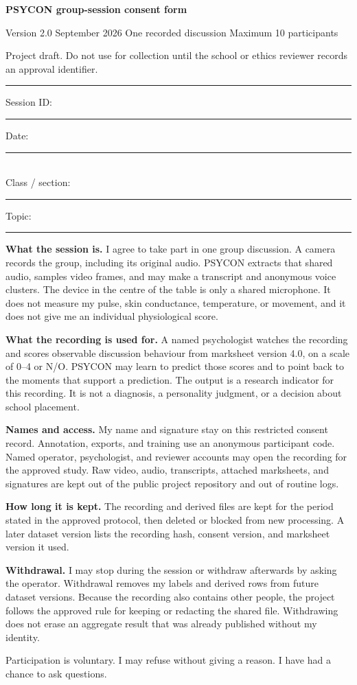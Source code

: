 \documentclass[10pt,a4paper]{article}
\begin{document}
{\LARGE\bfseries PSYCON group-session consent form}\par
{\small Version 2.0  September 2026 \quad One recorded discussion \quad Maximum 10 participants}\par
{\small Project draft. Do not use for collection until the school or ethics reviewer records an approval identifier.}\par
\vspace{2mm}\hrule\vspace{2mm}

Session ID: \rule{42mm}{0.35pt}\qquad
Date: \rule{32mm}{0.35pt}\\
Class / section: \rule{42mm}{0.35pt}\qquad
Topic: \rule{48mm}{0.35pt}

\vspace{2mm}
{\small
\textbf{What the session is.} I agree to take part in one group discussion. A camera records the group, including its original audio. PSYCON extracts that shared audio, samples video frames, and may make a transcript and anonymous voice clusters. The device in the centre of the table is only a shared microphone. It does not measure my pulse, skin conductance, temperature, or movement, and it does not give me an individual physiological score.

\textbf{What the recording is used for.} A named psychologist watches the recording and scores observable discussion behaviour from marksheet version 4.0, on a scale of 0--4 or N/O. PSYCON may learn to predict those scores and to point back to the moments that support a prediction. The output is a research indicator for this recording. It is not a diagnosis, a personality judgment, or a decision about school placement.

\textbf{Names and access.} My name and signature stay on this restricted consent record. Annotation, exports, and training use an anonymous participant code. Named operator, psychologist, and reviewer accounts may open the recording for the approved study. Raw video, audio, transcripts, attached marksheets, and signatures are kept out of the public project repository and out of routine logs.

\textbf{How long it is kept.} The recording and derived files are kept for the period stated in the approved protocol, then deleted or blocked from new processing. A later dataset version lists the recording hash, consent version, and marksheet version it used.

\textbf{Withdrawal.} I may stop during the session or withdraw afterwards by asking the operator. Withdrawal removes my labels and derived rows from future dataset versions. Because the recording also contains other people, the project follows the approved rule for keeping or redacting the shared file. Withdrawing does not erase an aggregate result that was already published without my identity.

Participation is voluntary. I may refuse without giving a reason. I have had a chance to ask questions.
}
\end{document}
